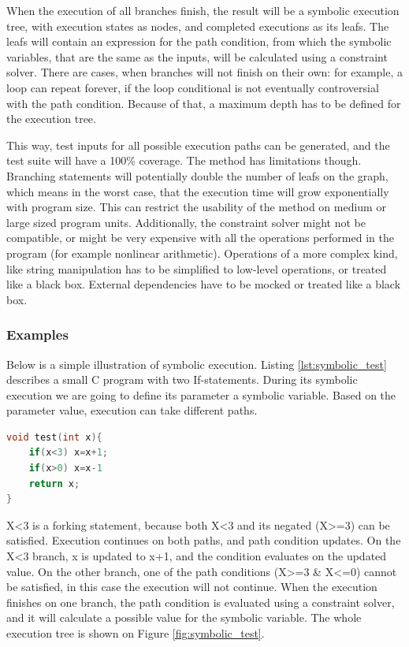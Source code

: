When the execution of all branches finish, the result will be a symbolic execution tree, with execution states as nodes, and completed executions as its leafs. The leafs will contain an expression for the path condition, from which the symbolic variables, that are the same as the inputs, will be calculated using a constraint solver. There are cases, when branches will not finish on their own: for example, a loop can repeat forever, if the loop conditional is not eventually controversial with the path condition. Because of that, a maximum depth has to be defined for the execution tree.

This way, test inputs for all possible execution paths can be generated, and the test suite will have a 100\% coverage. The method has limitations though. Branching statements will potentially double the number of leafs on the graph, which means in the worst case, that the execution time will grow exponentially with program size. This can restrict the usability of the method on medium or large sized program units. Additionally, the constraint solver might not be compatible, or might be very expensive with all the operations performed in the program (for example nonlinear arithmetic). \cite{z3_tutorial} Operations of a more complex kind, like string manipulation has to be simplified to low-level operations, or treated like a black box. External dependencies have to be mocked or treated like a black box.
\subsubsection{Examples}
Below is a simple illustration of symbolic execution. Listing \ref{lst:symbolic_test} describes a small C program with two If-statements. During its symbolic execution we are going to define its parameter a symbolic variable. Based on the parameter value, execution can take different paths. 

\begin{lstlisting}[frame=single,float=!ht,caption={An example program demonstrating symbolic execution},captionpos=b,label={lst:symbolic_test},language=C++]
void test(int x){
	if(x<3) x=x+1;
	if(x>0) x=x-1
	return x;
}
\end{lstlisting}

X<3 is a forking statement, because both X<3 and its negated (X>=3) can be satisfied. Execution continues on both paths, and path condition updates. On the X<3 branch, x is updated to x+1, and the condition evaluates on the updated value. On the other branch, one of the path conditions (X>=3 \& X<=0) cannot be satisfied, in this case the execution will not continue. When the execution finishes on one branch, the path condition is evaluated using a constraint solver, and it will calculate a possible value for the symbolic variable. The whole execution tree is shown on Figure \ref{fig:symbolic_test}. \cite{Pasareanu}

